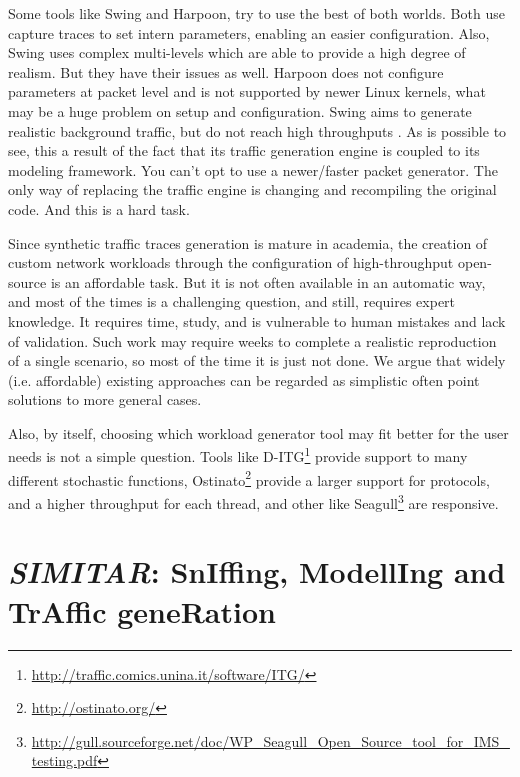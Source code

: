 Some tools like Swing and Harpoon, try to use the best of both worlds. Both use capture traces to set intern parameters, enabling an easier configuration. Also, Swing uses complex multi-levels which are able to provide a high degree of realism\cite{swing-paper}. But they have their issues as well. Harpoon does not configure parameters at packet level\cite{harpoon-paper} and is not supported by newer Linux kernels, what may be a huge problem on setup and configuration. Swing\cite{swing-paper} aims to generate realistic background traffic, but do not reach high throughputs \cite{swing-paper} \cite{legotg-paper}. As is possible to see, this a result of the fact that its traffic generation engine is coupled to its modeling framework. You can't opt to use a newer/faster packet generator. The only way of replacing the traffic engine is changing and recompiling the original code. And this is a hard task.

Since synthetic traffic traces generation is mature in academia, the creation of custom network workloads through the configuration of high-throughput open-source is an affordable task. But it is not often available in an automatic way, and most of the times is a challenging question\cite{legotg-paper}, and still, requires expert knowledge. It requires time, study, and is vulnerable to human mistakes and lack of validation. Such work may require weeks to complete a realistic reproduction of a single scenario, so most of the time it is just not done. We argue that widely (i.e. affordable) existing approaches can be regarded as simplistic often point solutions to more general cases. 

Also, by itself, choosing which workload generator tool may fit better for the user needs is not a simple question. Tools like D-ITG\footnote{\href{http://traffic.comics.unina.it/software/ITG/}{http://traffic.comics.unina.it/software/ITG/}} provide support to many different stochastic functions, Ostinato\footnote{\href{http://ostinato.org/}{http://ostinato.org/}} provide a larger support for protocols, and a higher throughput for each thread\cite{comparative-trafficgen-tools}, and other like Seagull\footnote{\href{http://gull.sourceforge.net/doc/WP_Seagull_Open_Source_tool_for_IMS_testing.pdf}{http://gull.sourceforge.net/doc/WP\_Seagull\_Open\_Source\_tool\_for\_IMS\_testing.pdf}} are responsive. 


\section{\textit{SIMITAR}: SnIffing, ModellIng and TrAffic geneRation}

